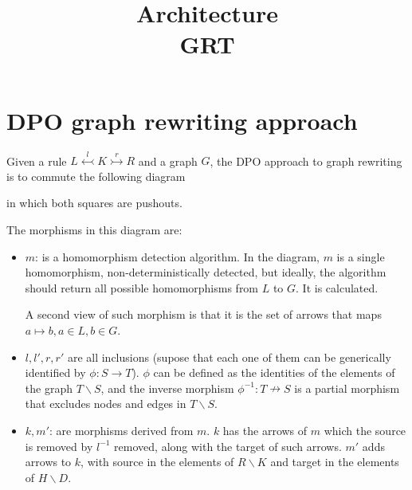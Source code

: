 \documentclass[a4paper]{report}
\title{Architecture\\GRT}
\begin{document}
\chapter{DPO graph rewriting approach}
Given a rule $L \overset{l}{\leftarrowtail} K \overset{r}{\rightarrowtail} R$ and a graph $G$, the DPO approach to graph rewriting is to commute the following diagram

\begin{center}
\end{center}
in which both squares are pushouts.

The morphisms in this diagram are:
\begin{itemize}
	\item $m$: is a homomorphism detection algorithm. In the diagram, $m$ is a single homomorphism, non-deterministically detected, but ideally, the algorithm should return all possible homomorphisms from $L$ to $G$. It is calculated.

	A second view of such morphism is that it is the set of arrows that maps $a \mapsto b, a \in L, b \in G$.

	\item $l, l', r, r'$ are all inclusions (supose that each one of them can be generically identified by $\phi : S \to T$). $\phi$ can be defined as the identities of the elements of the graph $T \backslash S$, and the inverse morphism $\phi^{-1}: T \nrightarrow S$ is a partial morphism that excludes nodes and edges in $T \backslash S$.

	\item $k, m'$: are morphisms derived from $m$. $k$ has the arrows of $m$ which the source is removed by $l^{-1}$ removed, along with the target of such arrows. $m'$ adds arrows to $k$, with source in the elements of $R \backslash K$ and target in the elements of $H \backslash D$.
\end{itemize}
\end{document}
